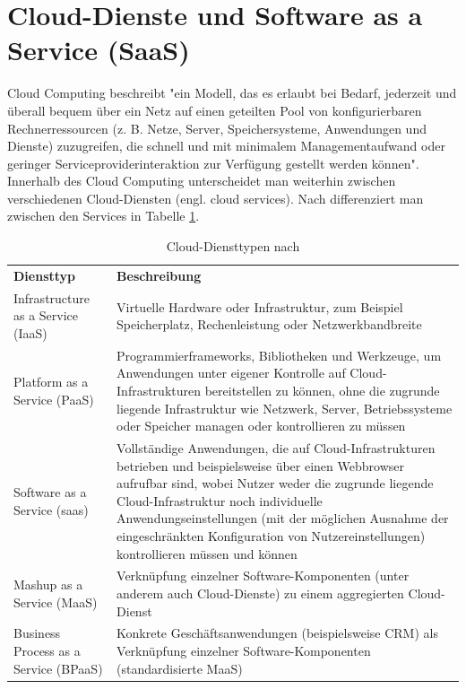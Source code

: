 \section{Cloud-Dienste und Software as a Service (SaaS)}\label{sec:SaaS}
Cloud Computing beschreibt "ein Modell, das es erlaubt bei Bedarf, jederzeit und überall bequem über ein Netz auf einen geteilten Pool von konfigurierbaren Rechnerressourcen (z. B. Netze, Server, Speichersysteme, Anwendungen und Dienste) zuzugreifen, die schnell und mit minimalem Managementaufwand oder geringer Serviceproviderinteraktion zur Verfügung gestellt werden können"\citep[S.~18]{appelrath_future_2014-1}. Innerhalb des Cloud Computing unterscheidet man weiterhin zwischen verschiedenen Cloud-Diensten (engl. cloud services). Nach \citep[S.~20]{appelrath_future_2014-1} differenziert man zwischen den Services in Tabelle \ref{tab:CloudServices}.
\begin{table}[H]
\begin{tabular}{|p{5cm}|p{10cm}|}
\hline
\textbf{Diensttyp} & \textbf{Beschreibung}\\
\hhline{==}
Infrastructure as a Service (IaaS) & Virtuelle Hardware oder Infrastruktur, zum Beispiel Speicherplatz, Rechenleistung oder Netzwerkbandbreite\\
\hline
Platform as a Service (PaaS) & Programmierframeworks, Bibliotheken und Werkzeuge, um Anwendungen unter eigener Kontrolle auf
Cloud-Infrastrukturen bereitstellen zu können, ohne die zugrunde liegende Infrastruktur wie Netzwerk,
Server, Betriebssysteme oder Speicher managen oder kontrollieren zu müssen\\
\hline
Software as a Service (\gls{saas}) & Vollständige Anwendungen, die auf Cloud-Infrastrukturen betrieben und beispielsweise über einen
Webbrowser aufrufbar sind, wobei Nutzer weder die zugrunde liegende Cloud-Infrastruktur noch
individuelle Anwendungseinstellungen (mit der möglichen Ausnahme der eingeschränkten Konfiguration
von Nutzereinstellungen) kontrollieren müssen und können\\
\hline
Mashup as a Service (MaaS) & Verknüpfung einzelner Software-Komponenten (unter anderem auch Cloud-Dienste) zu einem aggregierten
Cloud-Dienst\\
\hline
Business Process as a Service (BPaaS) & Konkrete Geschäftsanwendungen (beispielsweise CRM) als Verknüpfung einzelner Software-Komponenten
(standardisierte MaaS)\\
\hline
\end{tabular}
\caption{Cloud-Diensttypen nach \citep[S.~20]{appelrath_future_2014-1}}
\label{tab:CloudServices}
\end{table}
